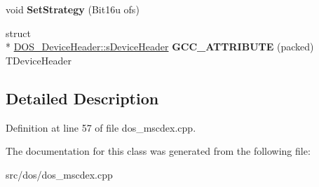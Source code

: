 \begin{DoxyCompactItemize}
\item 
\hypertarget{classDOS__DeviceHeader_aa107e28719ec8b2b02bfb5dea9683107}{void {\bfseries Set\-Strategy} (Bit16u ofs)}\label{classDOS__DeviceHeader_aa107e28719ec8b2b02bfb5dea9683107}

\item 
\hypertarget{classDOS__DeviceHeader_a4d78a74a1de44a090612c893030eca48}{struct \\*
\hyperlink{structDOS__DeviceHeader_1_1sDeviceHeader}{D\-O\-S\-\_\-\-Device\-Header\-::s\-Device\-Header} {\bfseries G\-C\-C\-\_\-\-A\-T\-T\-R\-I\-B\-U\-T\-E} (packed) T\-Device\-Header}\label{classDOS__DeviceHeader_a4d78a74a1de44a090612c893030eca48}

\end{DoxyCompactItemize}


\subsection{Detailed Description}


Definition at line 57 of file dos\-\_\-mscdex.\-cpp.



The documentation for this class was generated from the following file\-:\begin{DoxyCompactItemize}
\item 
src/dos/dos\-\_\-mscdex.\-cpp\end{DoxyCompactItemize}
